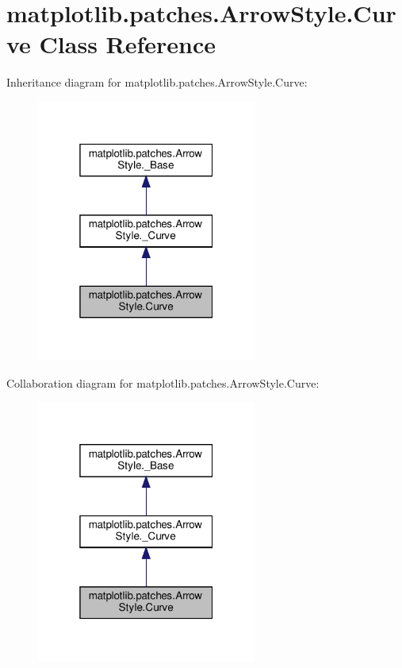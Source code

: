 \hypertarget{classmatplotlib_1_1patches_1_1ArrowStyle_1_1Curve}{}\section{matplotlib.\+patches.\+Arrow\+Style.\+Curve Class Reference}
\label{classmatplotlib_1_1patches_1_1ArrowStyle_1_1Curve}


Inheritance diagram for matplotlib.\+patches.\+Arrow\+Style.\+Curve\+:
\nopagebreak
\begin{figure}[H]
\begin{center}
\leavevmode
\includegraphics[width=205pt]{classmatplotlib_1_1patches_1_1ArrowStyle_1_1Curve__inherit__graph}
\end{center}
\end{figure}


Collaboration diagram for matplotlib.\+patches.\+Arrow\+Style.\+Curve\+:
\nopagebreak
\begin{figure}[H]
\begin{center}
\leavevmode
\includegraphics[width=205pt]{classmatplotlib_1_1patches_1_1ArrowStyle_1_1Curve__coll__graph}
\end{center}
\end{figure}
